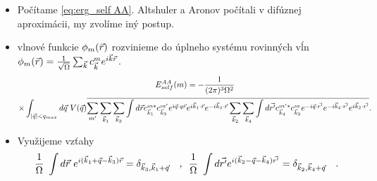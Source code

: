 \documentclass[
	11pt, %
]{beamer}
\begin{document}
\begin{frame}
\begin{itemize}
\item Počítame \eqref{eq:erg_self AA}. Altshuler a Aronov počítali v difúznej aproximácii, my zvolíme iný postup.
\item vlnové funkcie $\phi_m(\vec{r})$ rozvinieme do úplneho systému rovinných vĺn $\phi_m(\vec{r}) = \frac{1}{\sqrt{\Omega}}\sum_{\vec{k}}c_{\vec{k}}^me^{i\vec{k}\vec{r}}$. 
\tiny
\begin{multline}
E_{self}^{AA}(m)=  - \frac{1}{(2\pi)^3\Omega^2}     \\
\times  \int_{|\vec{q}| < q_{max}} d\vec{q}\ V(\vec{q})\overline{ \sum_{m'} \sum_{\vec{k}_1} \sum_{\vec{k}_3}\int d\vec{r} c^{m*}_{\vec{k}_1}c^{m'}_{\vec{k}_3}e^{i\vec{q}\cdot q\vec{r}}e^{i\vec{k}_1\cdot \vec{r}}e^{-i\vec{k}_3\cdot \vec{r}} \sum_{\vec{k}_2}\sum_{\vec{k}_4} \int d\vec{r'} c^{m'*}_{\vec{k}_4}c^{m}_{\vec{k}_2}e^{-i\vec{q}\cdot \vec{r'}}e^{-i\vec{k}_4\cdot \vec{r'}}e^{i\vec{k}_2\cdot \vec{r'}}} \text{.}
\end{multline}
\normalsize
\item Využijeme vzťahy
\begin{equation}
\frac{1}{\Omega}\ \int d\vr\ e^{i(\vk_1+\vq-\vk_3)\vr}=\delta_{\vk_3,\vk_1+\vq}
\  \   \  \text{,}
\ \
\frac{1}{\Omega} \ \int d\vrp e^{i(\vk_2-\vq-\vk_4)\vrp}=\delta_{\vk_2,\vk_4+\vq}
\ \ \  \text{.}
\end{equation}

\end{itemize}
\end{frame}
\end{document}
